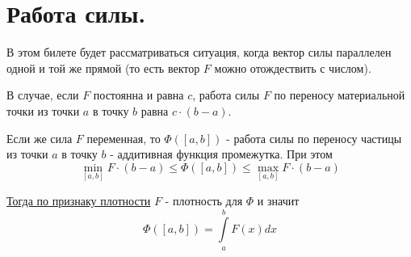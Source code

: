 \documentclass[../main.tex]{subfiles}
\begin{document}
\newpage
\section{Работа силы.}
В этом билете будет рассматриваться ситуация, когда вектор силы параллелен одной и той же прямой (то есть вектор \( F\) можно отождествить с числом). 

В случае, если \( F\) постоянна и равна \( c\), работа силы \( F\) по переносу материальной точки из точки \( a\) в точку \( b\) равна \( c \cdot \left( b-a\right)\).

Если же сила \( F\) переменная, то \( \Phi\left( \left[ a,b\right]\right)\) - работа силы по переносу частицы из точки \( a\) в точку \( b\) - аддитивная функция промежутка. При этом 
\[ \min\limits_{ \left[ a,b\right]} F \cdot \left( b-a\right) \leq \Phi\left( \left[ a,b\right]\right) \leq \max\limits_{ \left[ a,b\right]} F \cdot \left( b-a\right)\]

\hyperlink{thm:density}{Тогда по признаку плотности} \( F\) - плотность для \( \Phi\) и значит 
\[ \boxed{\Phi\left( \left[ a,b\right]\right)= \displaystyle\int\limits_{ a}^{ b} F\left( x\right)dx}\]
\end{document}
